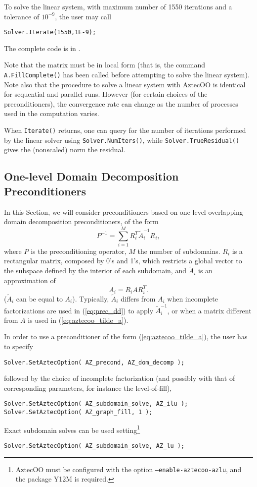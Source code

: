 To solve the linear system, with maximum number of 1550 iterations and a
tolerance of $10^{-9}$, the user may call
\begin{verbatim}
Solver.Iterate(1550,1E-9);
\end{verbatim}
The complete code is in .

Note that the matrix must be in local form (that is, the command
\verb!A.FillComplete()! has been called before attempting to solve the
linear system).  Note also that the procedure to solve a linear system
with AztecOO is identical for sequential and parallel runs.  However
(for certain choices of the preconditioners), the convergence rate can
change as the number of processes used in the computation varies.

When \verb!Iterate()! returns, one can query for the number of
iterations performed by the linear solver using
\verb!Solver.NumIters()!, while \verb!Solver.TrueResidual()! gives the
(nonscaled) norm the residual.



\subsection{One-level Domain Decomposition Preconditioners}
\label{sec:aztecoo_dd}

In this Section, we will consider preconditioners based on one-level
overlapping domain decomposition preconditioners, of the form
\begin{equation}
  \label{eq:prec_dd}
  P^{-1} = \sum_{i=1}^M R_i^T \tilde{A}_i^{-1} R_i,
\end{equation}
where $P$ is the preconditioning operator, $M$ the number of subdomains.
$R_i$ is a rectangular matrix, composed by 0's and 1's, which restricts
a global vector to the subspace defined by the interior of each
subdomain, and $\tilde{A}_i$ is an approximation of
\begin{equation}
  \label{eq:aztecoo_tilde_a}
  A_i = R_i A R_i^T .
\end{equation}
($\tilde{A}_i$ can be equal to $A_i$). Typically, $\tilde{A}_i$ differs
from $A_i$ when incomplete factorizations are used in (\ref{eq:prec_dd})
to apply $\tilde{A}_i^{-1}$, or when a matrix different from $A$ is used
in (\ref{eq:aztecoo_tilde_a}).

In order to use a preconditioner of the form (\ref{eq:aztecoo_tilde_a}),
the user has to specify
\begin{verbatim}
Solver.SetAztecOption( AZ_precond, AZ_dom_decomp );
\end{verbatim}
followed by the choice of incomplete factorization (and possibly with
that of corresponding parameters, for instance the level-of-fill),
\begin{verbatim}
Solver.SetAztecOption( AZ_subdomain_solve, AZ_ilu );
Solver.SetAztecOption( AZ_graph_fill, 1 );
\end{verbatim}
Exact subdomain solves can be used setting\footnote{AztecOO must be
  configured with the option {\tt --enable-aztecoo-azlu}, and the
  package Y12M is required.}
\begin{verbatim}
Solver.SetAztecOption( AZ_subdomain_solve, AZ_lu );
\end{verbatim}

